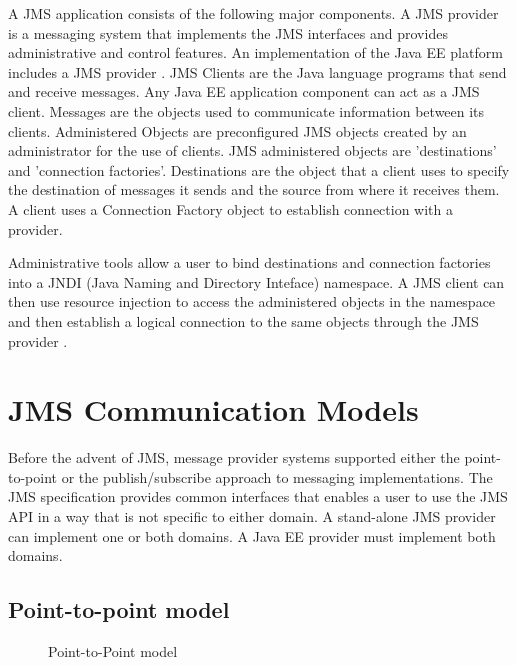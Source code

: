 \documentclass[9pt,twocolumn,twoside]{styles/osajnl}
\begin{document}
A JMS application consists of the following major components.  A JMS
provider is a messaging system that implements the JMS interfaces and
provides administrative and control features. An implementation of the
Java EE platform includes a JMS provider
\cite{www-jms-tutorialoracle}. JMS Clients are the Java language
programs that send and receive messages. Any Java EE application
component can act as a JMS client.  Messages are the objects used to
communicate information between its clients.  Administered Objects are
preconfigured JMS objects created by an administrator for the use of
clients.  JMS administered objects are 'destinations' and 'connection
factories'. Destinations are the object that a client uses to specify
the destination of messages it sends and the source from where it
receives them.  A client uses a Connection Factory object to establish
connection with a provider.

Administrative tools allow a user to bind destinations and connection
factories into a JNDI (Java Naming and Directory Inteface)
namespace. A JMS client can then use resource injection to access the
administered objects in the namespace and then establish a logical
connection to the same objects through the JMS provider
\cite{www-jms-tutorialoracle}.


\section{JMS Communication Models}

Before the advent of JMS, message provider systems supported either
the point-to-point or the publish/subscribe approach to messaging
implementations. The JMS specification provides common interfaces that
enables a user to use the JMS API in a way that is not specific to
either domain. A stand-alone JMS provider can implement one or both
domains. A Java EE provider must implement both domains.

\subsection{Point-to-point model}

\begin{figure}[htbp]
\centering
{}
\caption{\cite{www-jms-tutorialoracle} Point-to-Point model}
\label{fig:Point-to-Point messaging}
\end{figure}
\end{document}
